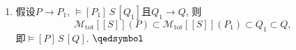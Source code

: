 \documentclass[UTF8]{ctexart}
\begin{document}
\begin{enumerate}
    \vspace{1pt}\hspace{2.17em}
    所以任意的$\sigma\models P$在$\mathbf{while}\,\,B\,\,
    \mathbf{do}\,\,S\,\,\mathbf{od}$下终止, 同时(在PW一节)已证
    \[
        \models\{P\land B\}\,S\,\{P\}\quad\implies\quad
        \models\{P\}\,\mathbf{while}\,\,B\,\,
        \mathbf{do}\,\,S\,\,\mathbf{od}\,\{P\land\neg\,B\},
    \]
    所以$[\![\,\mathbf{while}\,\,B\,\,\mathbf{do}\,\,S\,\,\mathbf{od}\,]\!]
    (\sigma)\models P\land\neg\,B$, 即$\models[P]\,\mathbf{while}\,\,B\,\,
    \mathbf{do}\,\,S\,\,\mathbf{od}\,[P\land\neg\,B]$.

    \item 假设$P\to P_1$, $\models[P_1]\,S\,[Q_1]$且$Q_1\to Q$, 则
    \[
        \mathcal{M}_{\mathrm{tot}}[\![S]\!](P)\subset
        \mathcal{M}_{\mathrm{tot}}[\![S]\!](P_1)\subset Q_1\subset Q,
    \]
    即$\models[P]\,S\,[Q]$. \hfill $\qedsymbol$
\end{enumerate}
\end{document}
